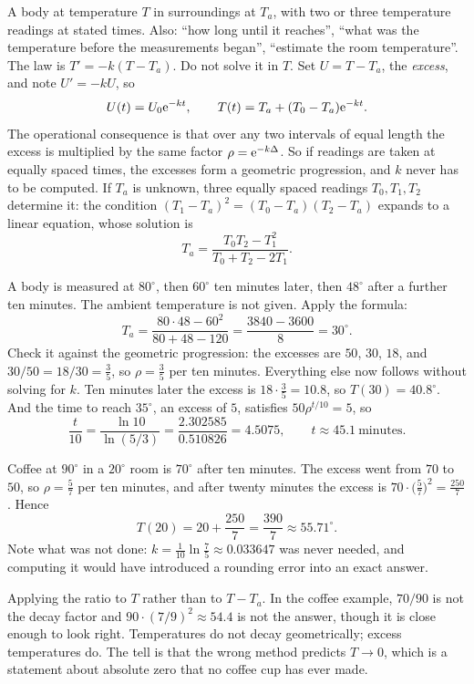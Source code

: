 \cue A body at temperature $T$ in surroundings at $T_a$, with two or three temperature readings at stated times. Also: ``how long until it reaches'', ``what was the temperature before the measurements began'', ``estimate the room temperature''.
\method The law is $T'=-k(T-T_a)$. Do not solve it in $T$. Set $U=T-T_a$, the \emph{excess}, and note $U'=-kU$, so
\[U(t)=U_0\mathrm{e}^{-kt},\qquad T(t)=T_a+(T_0-T_a)\mathrm{e}^{-kt}.\]
The operational consequence is that over any two intervals of equal length the excess is multiplied by the same factor $\rho=\mathrm{e}^{-k\Delta}$. So if readings are taken at equally spaced times, the excesses form a geometric progression, and $k$ never has to be computed. If $T_a$ is unknown, three equally spaced readings $T_0,T_1,T_2$ determine it: the condition $(T_1-T_a)^2=(T_0-T_a)(T_2-T_a)$ expands to a linear equation, whose solution is
\[T_a=\frac{T_0T_2-T_1^{2}}{T_0+T_2-2T_1}.\]

\begin{worked}
A body is measured at $80^{\circ}$, then $60^{\circ}$ ten minutes later, then $48^{\circ}$ after a further ten minutes. The ambient temperature is not given. Apply the formula:
\[T_a=\frac{80\cdot48-60^{2}}{80+48-120}=\frac{3840-3600}{8}=30^{\circ}.\]
Check it against the geometric progression: the excesses are $50$, $30$, $18$, and $30/50=18/30=\tfrac35$, so $\rho=\tfrac35$ per ten minutes. Everything else now follows without solving for $k$. Ten minutes later the excess is $18\cdot\tfrac35=10.8$, so $T(30)=40.8^{\circ}$. And the time to reach $35^{\circ}$, an excess of $5$, satisfies $50\rho^{t/10}=5$, so
\[\frac{t}{10}=\frac{\ln10}{\ln(5/3)}=\frac{2.302585}{0.510826}=4.5075,\qquad t\approx45.1\ \text{minutes}.\]
\end{worked}

\begin{worked}
Coffee at $90^{\circ}$ in a $20^{\circ}$ room is $70^{\circ}$ after ten minutes. The excess went from $70$ to $50$, so $\rho=\tfrac57$ per ten minutes, and after twenty minutes the excess is $70\cdot\bigl(\tfrac57\bigr)^{2}=\tfrac{250}{7}$. Hence
\[T(20)=20+\frac{250}{7}=\frac{390}{7}\approx55.71^{\circ}.\]
Note what was not done: $k=\tfrac{1}{10}\ln\tfrac75\approx0.033647$ was never needed, and computing it would have introduced a rounding error into an exact answer.
\end{worked}

\begin{trap}
Applying the ratio to $T$ rather than to $T-T_a$. In the coffee example, $70/90$ is not the decay factor and $90\cdot(7/9)^{2}\approx54.4$ is not the answer, though it is close enough to look right. Temperatures do not decay geometrically; excess temperatures do. The tell is that the wrong method predicts $T\to0$, which is a statement about absolute zero that no coffee cup has ever made.
\end{trap}

